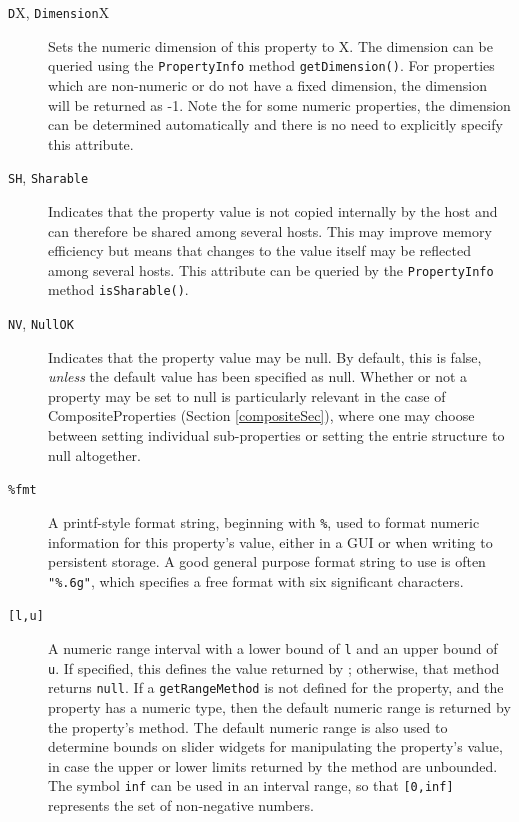 \documentclass{article}
\begin{document}
\begin{description}
\item[{\tt D}X, {\tt Dimension}X] \mbox{}

Sets the numeric dimension of this
property to X. The dimension can be queried using the 
{\tt PropertyInfo} method {\tt getDimension()}. For properties which are
non-numeric or do not have a fixed dimension, the dimension will be
returned as -1. Note the for some numeric properties, the dimension
can be determined automatically and there is no need to explicitly
specify this attribute.

\item[{\tt SH}, {\tt Sharable}] \mbox{}

Indicates that the property value is
not copied internally by the host and can therefore be shared among
several hosts. This may improve memory efficiency but means that
changes to the value itself may be reflected among several hosts.
This attribute can be queried by the {\tt PropertyInfo} method 
{\tt isSharable()}.

\item[{\tt NV}, {\tt NullOK}] \mbox{}

Indicates that the property value 
may be null. By default, this is false, {\it unless} the
default value has been specified as null. Whether
or not a property may be set to null is particularly
relevant in the case of CompositeProperties (Section \ref{compositeSec}),
where one may choose between setting individual sub-properties or
setting the entrie structure to null altogether.

\item[{\tt \%fmt} ] \mbox{}

A printf-style format string, beginning with {\tt \%}, used to
format numeric information for this property's value, either in a GUI
or when writing to persistent storage. A good general purpose format
string to use is often {\tt "\%.6g"}, which specifies a free format with
six significant characters.

\item[{\tt [l,u]} ] \mbox{}

A numeric range interval with a lower bound of {\tt l} and an
upper bound of {\tt u}. If specified, this defines the value returned by
; 
otherwise, that method
returns {\tt null}. If a {\tt getRangeMethod} is not defined for the property,
and the property has a numeric type, then the default numeric range is
returned by the property's 
 method. The
default numeric range is also used to determine bounds on slider
widgets for manipulating the property's value, in case the upper or
lower limits returned by the 
 method are
unbounded.  The symbol {\tt inf} can be used in an interval range, so that
{\tt [0,inf]} represents the set of non-negative numbers.

\end{description}
\end{document}
